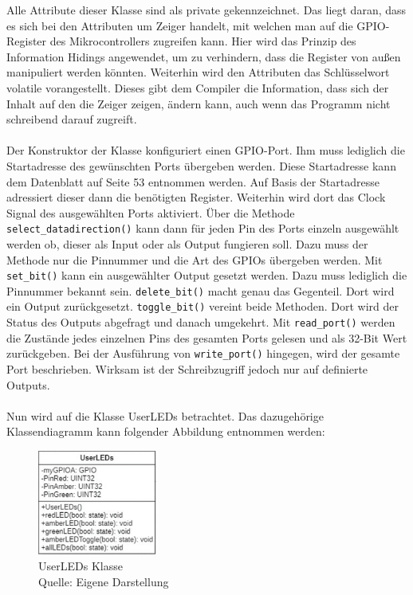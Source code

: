 Alle Attribute dieser Klasse sind als \glqq private\grqq{} gekennzeichnet. Das liegt daran, dass es sich bei den Attributen um Zeiger handelt, mit welchen man auf die GPIO-Register des Mikrocontrollers zugreifen kann. Hier wird das Prinzip des Information Hidings angewendet, um zu verhindern, dass die Register von außen manipuliert werden könnten. Weiterhin wird den Attributen das Schlüsselwort volatile vorangestellt. Dieses gibt dem Compiler die Information, dass sich der Inhalt auf den die Zeiger zeigen, ändern kann, auch wenn das Programm nicht schreibend darauf zugreift.\\
\\
Der Konstruktor der Klasse konfiguriert einen GPIO-Port. Ihm muss lediglich die Startadresse des gewünschten Ports übergeben werden. Diese Startadresse kann dem Datenblatt auf Seite 53 entnommen werden. Auf Basis der Startadresse adressiert dieser dann die benötigten Register. Weiterhin wird dort das Clock Signal des ausgewählten Ports aktiviert.
Über die Methode \texttt{select\_datadirection()} kann dann für jeden Pin des Ports einzeln ausgewählt werden ob, dieser als Input oder als Output fungieren soll. Dazu muss der Methode nur die Pinnummer und die Art des GPIOs übergeben werden.
Mit \texttt{set\_bit()} kann ein ausgewählter Output gesetzt werden. Dazu muss lediglich die Pinnummer bekannt sein. \texttt{delete\_bit()} macht genau das Gegenteil. Dort wird ein Output zurückgesetzt. \texttt{toggle\_bit()} vereint beide Methoden. Dort wird der Status des Outputs abgefragt und danach umgekehrt.
Mit \texttt{read\_port()} werden die Zustände jedes einzelnen Pins des gesamten Ports gelesen und als 32-Bit Wert zurückgeben. Bei der Ausführung von \texttt{write\_port()} hingegen, wird der gesamte Port beschrieben. Wirksam ist der Schreibzugriff jedoch nur auf definierte Outputs.\\
\\
Nun wird auf die Klasse \glqq UserLEDs\grqq{} betrachtet. Das dazugehörige Klassendiagramm kann folgender Abbildung entnommen werden: \\

\begin{figure}[H] 
	\centering
	\includegraphics[width=0.35\textwidth]{images/05.png}
	\caption{UserLEDs Klasse \protect \\ Quelle: Eigene Darstellung}
	\label{fig:grafik5}
\end{figure}

